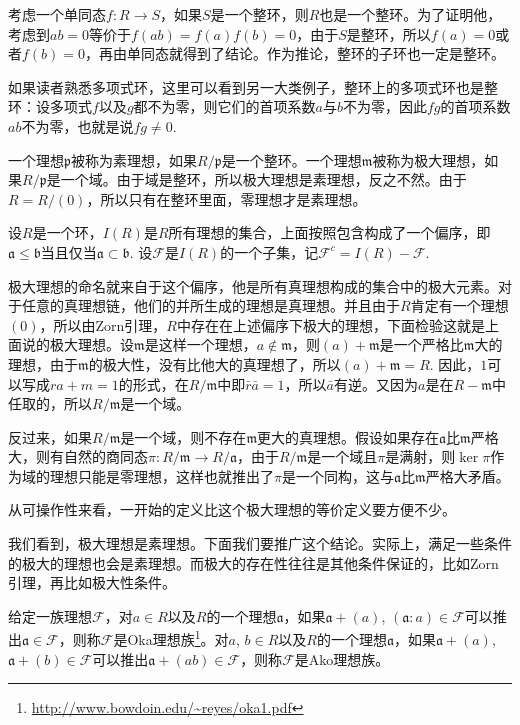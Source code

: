 考虑一个单同态$f:R\to S$，如果$S$是一个整环，则$R$也是一个整环。为了证明他，考虑到$ab=0$等价于$f(ab)=f(a)f(b)=0$，由于$S$是整环，所以$f(a)=0$或者$f(b)=0$，再由单同态就得到了结论。作为推论，整环的子环也一定是整环。

如果读者熟悉多项式环，这里可以看到另一大类例子，整环上的多项式环也是整环：设多项式$f$以及$g$都不为零，则它们的首项系数$a$与$b$不为零，因此$fg$的首项系数$ab$不为零，也就是说$fg\neq 0$.

\para 一个理想$\mathfrak{p}$被称为素理想，如果$R/\mathfrak{p}$是一个整环。一个理想$\mathfrak{m}$被称为极大理想，如果$R/\mathfrak{p}$是一个域。由于域是整环，所以极大理想是素理想，反之不然。由于$R=R/(0)$，所以只有在整环里面，零理想才是素理想。

\para 设$R$是一个环，$I(R)$是$R$所有理想的集合，上面按照包含构成了一个偏序，即$\mathfrak{a}\leq \mathfrak{b}$当且仅当$\mathfrak{a}\subset \mathfrak{b}$. 设$\mathcal{F}$是$I(R)$的一个子集，记$\mathcal{F}^c=I(R)-\mathcal{F}$.

极大理想的命名就来自于这个偏序，他是所有真理想构成的集合中的极大元素。对于任意的真理想链，他们的并所生成的理想是真理想。并且由于$R$肯定有一个理想$(0)$，所以由Zorn引理，$R$中存在在上述偏序下极大的理想，下面检验这就是上面说的极大理想。设$\mathfrak{m}$是这样一个理想，$a\notin \mathfrak{m}$，则$(a)+\mathfrak{m}$是一个严格比$\mathfrak{m}$大的理想，由于$\mathfrak{m}$的极大性，没有比他大的真理想了，所以$(a)+\mathfrak{m}=R$. 因此，$1$可以写成$ra+m=1$的形式，在$R/\mathfrak{m}$中即$\bar{r}\bar{a}=1$，所以$\bar{a}$有逆。又因为$a$是在$R-\mathfrak{m}$中任取的，所以$R/\mathfrak{m}$是一个域。

反过来，如果$R/\mathfrak{m}$是一个域，则不存在$\mathfrak{m}$更大的真理想。假设如果存在$\mathfrak{a}$比$\mathfrak{m}$严格大，则有自然的商同态$\pi:R/\mathfrak{m}\to R/\mathfrak{a}$，由于$R/\mathfrak{m}$是一个域且$\pi$是满射，则$\ker \pi$作为域的理想只能是零理想，这样也就推出了$\pi$是一个同构，这与$\mathfrak{a}$比$\mathfrak{m}$严格大矛盾。

从可操作性来看，一开始的定义比这个极大理想的等价定义要方便不少。

\para \label{oka}我们看到，极大理想是素理想。下面我们要推广这个结论。实际上，满足一些条件的极大的理想也会是素理想。而极大的存在性往往是其他条件保证的，比如Zorn引理，再比如极大性条件。

给定一族理想$\mathcal{F}$，对$a\in R$以及$R$的一个理想$\mathfrak{a}$，如果$\mathfrak{a}+(a)$, $(\mathfrak{a}:a)\in \mathcal{F}$可以推出$\mathfrak{a}\in \mathcal{F}$，则称$\mathcal{F}$是Oka理想族\footnote{\url{http://www.bowdoin.edu/~reyes/oka1.pdf}}。对$a$, $b\in R$以及$R$的一个理想$\mathfrak{a}$，如果$\mathfrak{a}+(a)$, $\mathfrak{a}+(b)\in \mathcal{F}$可以推出$\mathfrak{a}+(ab)\in \mathcal{F}$，则称$\mathcal{F}$是Ako理想族。

